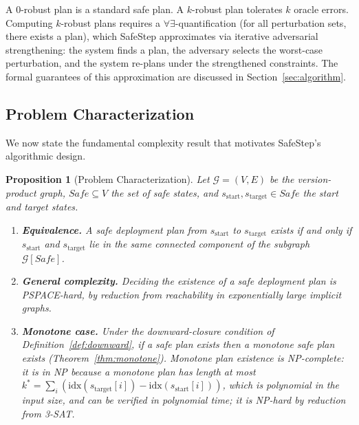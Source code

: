 \documentclass[10pt,twocolumn]{article}
\newtheorem{proposition}[theorem]{Proposition}
\begin{document}
\noindent
A $0$-robust plan is a standard safe plan.  A $k$-robust plan tolerates
$k$ oracle errors.  Computing $k$-robust plans requires a
$\forall\exists$-quantification (for all perturbation sets, there exists a
plan), which SafeStep approximates via iterative adversarial strengthening:
the system finds a plan, the adversary selects the worst-case perturbation,
and the system re-plans under the strengthened constraints.  The formal
guarantees of this approximation are discussed in Section~\ref{sec:algorithm}.

\subsection{Problem Characterization}
\label{sec:formal:characterization}

We now state the fundamental complexity result that motivates SafeStep's
algorithmic design.

\begin{proposition}[Problem Characterization]
\label{prop:characterization}
Let $\mathcal{G} = (V, E)$ be the version-product graph,
$\mathit{Safe} \subseteq V$ the set of safe states, and
$s_{\mathrm{start}}, s_{\mathrm{target}} \in \mathit{Safe}$ the start and
target states.
\begin{enumerate}
\item \textbf{Equivalence.}  A safe deployment plan from
  $s_{\mathrm{start}}$ to $s_{\mathrm{target}}$ exists if and only if
  $s_{\mathrm{start}}$ and $s_{\mathrm{target}}$ lie in the same connected
  component of the subgraph $\mathcal{G}[\mathit{Safe}]$.
\item \textbf{General complexity.}  Deciding the existence of a safe
  deployment plan is \textsc{PSPACE}-hard, by reduction from reachability
  in exponentially large implicit graphs.
\item \textbf{Monotone case.}  Under the downward-closure condition of
  Definition~\ref{def:downward}, if a safe plan exists then a
  \emph{monotone} safe plan exists (Theorem~\ref{thm:monotone}).
  Monotone plan existence is \textsc{NP}-complete: it is in
  \textsc{NP} because a monotone plan has length at most
  $k^* = \sum_i (\mathrm{idx}(s_{\mathrm{target}}[i]) -
  \mathrm{idx}(s_{\mathrm{start}}[i]))$, which is polynomial in the
  input size, and can be verified in polynomial time; it is
  \textsc{NP}-hard by reduction from \textsc{3-SAT}.
\end{enumerate}
\end{proposition}
\end{document}
